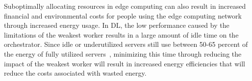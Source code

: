 \documentclass[../mthe-493-final-project.tex]{subfiles}
\begin{document}
    Suboptimally allocating resources in edge computing can also result in increased financial and environmental costs for people using the edge computing network through increased energy usage. In DL, the low performance caused by the limitations of the weakest worker results in a large amount of idle time on the orchestrator. Since idle or underutilized servers still use between 50-65 percent of the energy of fully utilized servers~\cite{noauthor_triple_nodate}, minimizing this time through reducing the impact of the weakest worker will result in increased energy efficiencies that will reduce the costs associated with wasted energy.
    
\end{document}
